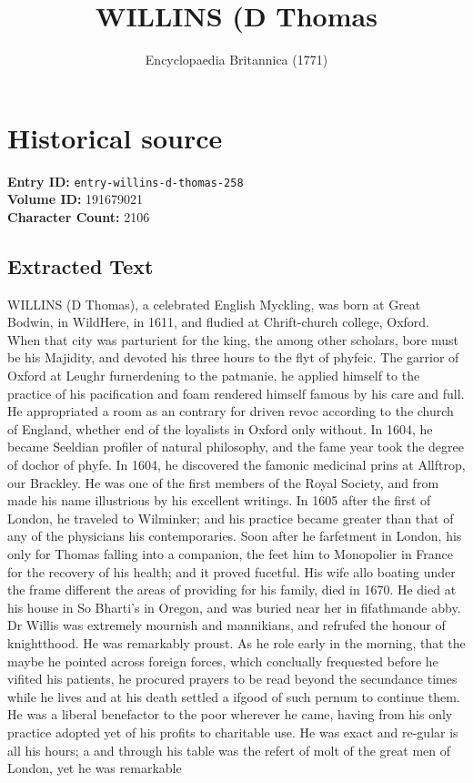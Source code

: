 \documentclass{article}
\title{WILLINS (D Thomas}
\date{Encyclopaedia Britannica (1771)}
\begin{document}
\maketitle

\section*{Historical source}
\textbf{Entry ID:} \texttt{entry-willins-d-thomas-258} \\
\textbf{Volume ID:} 191679021 \\
\textbf{Character Count:} 2106

\subsection*{Extracted Text}
WILLINS (D Thomas), a celebrated English Myckling, was born at Great Bodwin, in WildHere, in 1611, and fludied at Chrift-church college, Oxford. When that city was parturient for the king, the among other scholars, bore must be his Majidity, and devoted his three hours to the flyt of phyfeic. The garrior of Oxford at Leughr furnerdening to the patmanie, he applied himself to the practice of his pacification and foam rendered himself famous by his care and full. He appropriated a room as an contrary for driven revoc according to the church of England, whether end of the loyalists in Oxford only without. In 1604, he became Seeldian profiler of natural philosophy, and the fame year took the degree of dochor of phyfe. In 1604, he discovered the famonic medicinal prins at Allftrop, our Brackley. He was one of the first members of the Royal Society, and from made his name illustrious by his excellent writings. In 1605 after the first of London, he traveled to Wilminker; and his practice became greater than that of any of the physicians his contemporaries. Soon after he farfetment in London, his only for Thomas falling into a companion, the feet him to Monopolier in France for the recovery of his health; and it proved fucetful. His wife allo boating under the frame different the areas of providing for his family, died in 1670. He died at his house in So Bharti's in Oregon, and was buried near her in fifathmande abby. Dr Willis was extremely mournish and mannikians, and refrufed the honour of knightthood. He was remarkably proust. As he role early in the morning, that the maybe he pointed across foreign forces, which conclually frequested before he vifited his patients, he procured prayers to be read beyond the secundance times while he lives and at his death settled a ifgood of such pernum to continue them. He was a liberal benefactor to the poor wherever he came, having from his only practice adopted yet of his profits to charitable use. He was exact and re-gular is all his hours; a and through his table was the refert of molt of the great men of London, yet he was remarkable
\end{document}
